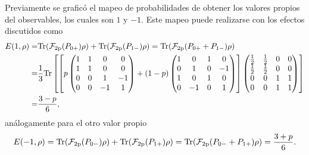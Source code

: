 Previamente se graficó el mapeo de probabilidades de obtener los valores propios del observables, los cuales son $1$ y $-1$. Este mapeo puede realizarse con los efectos discutidos como \[\begin{split}E(1,\rho)=&{\rm Tr}(\mathcal{F}_{2\text{p}}(P_{0+})\rho) +{\rm Tr}(\mathcal{F}_{2\text{p}}(P_{1-})\rho)={\rm Tr}(\mathcal{F}_{2\text{p}}(P_{0+}+P_{1-})\rho)\\ 
    =&\frac{1}{3}{\rm Tr}\left[\left[p\begin{pmatrix}
        1&1&0&0\\
        1&1&0&0\\
        0&0&1&-1\\
        0&0&-1&1\\
    \end{pmatrix}+ (1-p)\begin{pmatrix}
        1&0&1&0\\ 
        0&1&0&-1\\
        1&0&1&0\\
        0&-1&0&1\\
    \end{pmatrix}\right]\begin{pmatrix}
        \tfrac{1}{2}&\tfrac{1}{2}&0&0\\
        \tfrac{1}{2}&\tfrac{1}{2}&0&0\\
        0&0&1&1\\
        0&0&1&1\\
    \end{pmatrix}\right]\\
    =&\frac{3-p}{6},
    \end{split}\]  análogamente para el otro valor propio
    \[E(-1,\rho)={\rm Tr}(\mathcal{F}_{2\text{p}}(P_{0-})\rho) +{\rm Tr}(\mathcal{F}_{2\text{p}}(P_{1+})\rho)={\rm Tr}(\mathcal{F}_{2\text{p}}(P_{0-}+P_{1+})\rho)=\frac{3+p}{6}.\]
    



